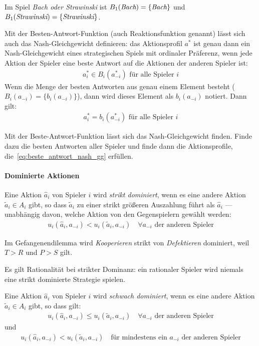 Im Spiel \emph{Bach oder Strawinski} ist
$B_1(\emph{Bach}) = \{ \emph{Bach} \}$ und
$B_1(\emph{Strawinski}) = \{ \emph{Strawinski} \}$.

Mit der Besten-Antwort-Funktion (auch Reaktionsfunktion genannt) lässt sich auch das
Nash-Gleichgewicht definieren:
das Aktionsprofil $a^*$ ist genau dann ein Nash-Gleichgewicht eines strategischen Spiels
mit ordinaler Präferenz, wenn jede Aktion der Spieler eine beste Antwort auf die Aktionen
der anderen Spieler ist:
\begin{align}
  \label{eq:beste_antwort_nash_gg}
  a^*_i \in B_i(a^*_{-i}) \text{ für alle Spieler $i$}
\end{align}
Wenn die Menge der besten Antworten aus genau einem Element besteht
($B_i(a_{-i}) = \{ b_i(a_{-i}) \}$),
dann wird dieses Element als $b_i(a_{-i})$ notiert.
Dann gilt:
\begin{align*}
  a^*_i = b_i(a^*_{-i}) \text{ für alle Spieler $i$}
\end{align*}

Mit der Beste-Antwort-Funktion lässt sich das Nash-Gleichgewicht finden.
Finde dazu die besten Antworten aller Spieler und finde dann die Aktionsprofile,
die~\ref{eq:beste_antwort_nash_gg} erfüllen.

\paragraph{Dominierte Aktionen}%
\label{par:dominierte_aktionen}

\begin{definition}
  Eine Aktion $\hat{a}_i$ von Spieler $i$ wird \emph{strikt dominiert},
  wenn es eine andere Aktion $\tilde{a}_i \in A_i$ gibt,
  so dass $\tilde{a}_i$ zu einer strikt größeren Auszahlung führt als $\hat{a}_i$
  — unabhängig davon, welche Aktion von den Gegenspielern gewählt werden:
  \begin{align*}
    u_i(\hat{a}_i, a_{-i}) < u_i(\tilde{a}_i, a_{-i})
    \quad
    \forall a_{-i} \text{ der anderen Spieler}
  \end{align*}
\end{definition}

Im Gefangenendilemma wird \emph{Kooperieren} strikt von \emph{Defektieren} dominiert, weil
$T > R$ und $P > S$ gilt.

Es gilt Rationalität bei strikter Dominanz: ein rationaler Spieler wird niemals eine
strikt dominierte Strategie spielen.

\begin{definition}
  Eine Aktion $\hat{a}_i$ von Spieler $i$ wird \emph{schwach dominiert}, wenn es eine
  andere Aktion $\tilde{a}_i \in A_i$ gibt, so dass gilt:
  \begin{align*}
    u_i(\hat{a}_i, a_{-i}) \leq u_i(\tilde{a}_i, a_{-i})
    \quad \forall a_{-i} \text{ der anderen Spieler}
  \end{align*}
  und
  \begin{align*}
    u_i(\hat{a}_i, a_{-i}) < u_i(\tilde{a}_i, a_{-i})
    \quad \text{für mindestens ein $a_{-i}$ der anderen Spieler}
  \end{align*}
\end{definition}


